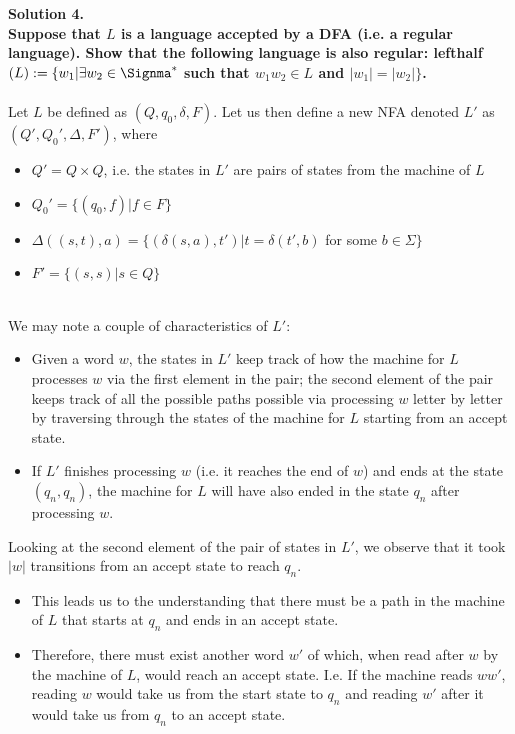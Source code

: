 \documentclass{article}
\begin{document}
\noindent \textbf{Solution 4. 
\\Suppose that \(L\) is a language accepted by a DFA (i.e. a regular language). Show that the following language is also regular: lefthalf\((L) := \{w_1 | \exists w_2 \in \Signma^*\) such that \(w_1 w_2 \in L\) and \(|w_1|=|w_2|\}\).}
\\
\\Let \(L\) be defined as \((Q, q_0,\delta, F)\). Let us then define a new NFA denoted \(L'\) as \((Q', Q_0', \Delta, F')\), where
    \begin{itemize}
        \item\(Q' = Q \times Q\), i.e. the states in \(L'\) are pairs of states from the machine of \(L\)
        \item \(Q_0' = \{(q_0,f)|f \in F\}\)
        \item \(\Delta((s,t),a) = \{(\delta(s,a),t')|t=\delta(t',b)\) for some \(b\in \Sigma\}\)
        \item \(F'=\{(s,s)|s\in Q\}\)
    \end{itemize}
\\We may note a couple of characteristics of \(L'\):
\begin{itemize}
    \item Given a word \(w\), the states in \(L'\) keep track of how the machine for \(L\) processes \(w\) via the first element in the pair; the second element of the pair keeps track of all the possible paths possible via processing \(w\) letter by letter by traversing through the states of the machine for \(L\) starting from an accept state.
    \item If \(L'\) finishes processing \(w\) (i.e. it reaches the end of \(w\)) and ends at the state \((q_n,q_n)\), the machine for \(L\) will have also ended in the state \(q_n\) after processing \(w\).
\end{itemize}
Looking at the second element of the pair of states in \(L'\), we observe that it took \(|w|\) transitions from an accept state to reach \(q_n\). 
\begin{itemize}
    \item This leads us to the understanding that there must be a path in the machine of \(L\) that starts at \(q_n\) and ends in an accept state.
    \item Therefore, there must exist another word \(w'\) of which, when read after \(w\) by the machine of \(L\), would reach an accept state. I.e. If the machine reads \(ww'\), reading \(w\) would take us from the start state to \(q_n\) and reading \(w'\) after it would take us from \(q_n\) to an accept state.
\end{itemize}
\end{document}
